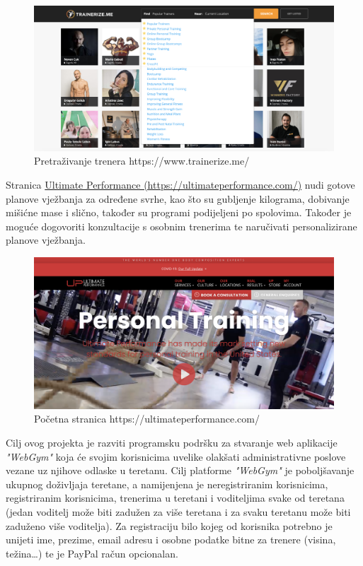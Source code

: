 		\begin{figure}[H]
			\includegraphics[scale=0.20]{slike/trainerizeme2.PNG} %
			\centering
			\caption{Pretraživanje trenera https://www.trainerize.me/}
			\label{fig:promjene}
		\end{figure}
	
		Stranica \href{https://ultimateperformance.com/}{Ultimate Performance (https://ultimateperformance.com/)} nudi gotove planove vježbanja za određene
		svrhe, kao što su gubljenje kilograma, dobivanje mišićne mase i slično, također 
		su programi podijeljeni po spolovima. Također je moguće dogovoriti konzultacije 
		s osobnim trenerima te naručivati personalizirane planove vježbanja.
		
		\begin{figure}[H]
			\includegraphics[scale=0.20]{slike/ultimateperformance.PNG} %
			\centering
			\caption{Početna stranica https://ultimateperformance.com/}
			\label{fig:promjene}
		\end{figure}
		
		\vspace{5mm}
		
		Cilj ovog projekta je razviti programsku podršku za stvaranje web aplikacije
		\textit{"WebGym"} koja će svojim korisnicima uvelike olakšati administrativne 
		poslove vezane uz njihove odlaske u teretanu. Cilj platforme \textit{"WebGym"} 
		je poboljšavanje ukupnog doživljaja teretane, a namijenjena je neregistriranim 
		korisnicima, registriranim korisnicima, trenerima u teretani i voditeljima svake od 
		teretana (jedan voditelj može biti zadužen za više
		teretana i za svaku teretanu može biti zaduženo više voditelja). Za registraciju bilo kojeg od korisnika potrebno je unijeti
		ime, prezime, email adresu i osobne podatke bitne za trenere (visina, težina…) te je PayPal račun opcionalan. 
		

